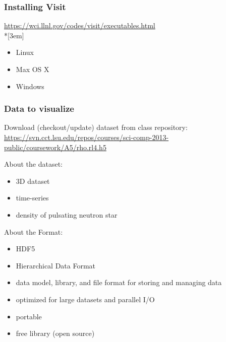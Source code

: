 
\usepackage{ragged2e}
\usepackage{amsmath}
\usepackage{listings}
\newcommand{\Heaviside}{\operatorname{\Theta}}

\subtitle[Module A]{{\large Module A: Basic Skills}\\*[0.3em]Lecture 5: 3D Visualization using Visit}
\author[\mbox{\texttt{[image: fl\_300]}\hspace{0.5em}Frank Löffler}]{Dr Frank Löffler}
\date{Fri, Sep 13 2013}




\frame{\titlepage}

\begin{frame}
\frametitle{Installing Visit}
\begin{centering}
\href{https://wci.llnl.gov/codes/visit/executables.html}{https://wci.llnl.gov/codes/visit/executables.html}\\*[3em]
\begin{itemize}
 \item Linux
 \item Max OS X
 \item Windows
\end{itemize}
\end{centering}
\end{frame}

\begin{frame}
\frametitle{Data to visualize}
\begin{centering}
Download (checkout/update) dataset from class repository:\\
\href{https://svn.cct.lsu.edu/repos/courses/sci-comp-2013-public/coursework/A5/rho.rl4.h5}{https://svn.cct.lsu.edu/repos/courses/sci-comp-2013-public/coursework/A5/rho.rl4.h5}\\
\end{centering}
About the dataset:
\begin{itemize}
 \item 3D dataset
 \item time-series
 \item density of pulsating neutron star
\end{itemize}
About the Format:
\begin{itemize}
 \item HDF5
 \item Hierarchical Data Format
 \item data model, library, and file format for storing and managing data
 \item optimized for large datasets and parallel I/O
 \item portable
 \item free library (open source)
\end{itemize}
\end{frame}

